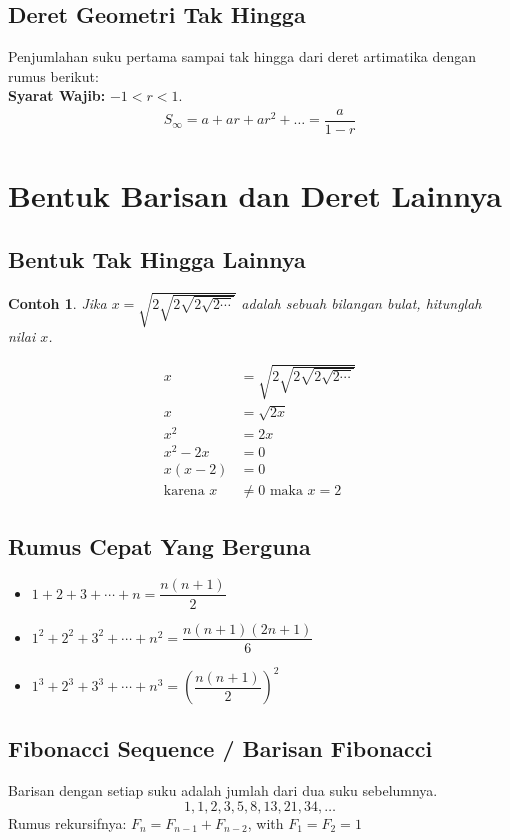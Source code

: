 \documentclass[12pt]{scrartcl}
\newtheorem{contoh}{Contoh}
\begin{document}
\subsection{Deret Geometri Tak Hingga}
Penjumlahan suku pertama sampai tak hingga dari deret artimatika dengan rumus berikut:\\
\textbf{Syarat Wajib: } $-1 < r < 1$.
\begin{align*}
    S_\infty = a + ar+ar^2+\ldots = \dfrac{a}{1-r}
\end{align*}

\section{Bentuk Barisan dan Deret Lainnya}

\subsection{Bentuk Tak Hingga Lainnya}
\begin{contoh}
Jika $x=\sqrt{2\sqrt{2\sqrt{2\sqrt{2\cdots}}}}$ adalah sebuah bilangan bulat, hitunglah nilai $x$.
\end{contoh}
\begin{solusi}
    \begin{align*}
        x &= \sqrt{2\sqrt{2\sqrt{2\sqrt{2\cdots}}}}\\
        x &= \sqrt{2x}\\
        x^2 &= 2x\\
        x^2 - 2x &= 0\\
        x(x - 2) &= 0\\
        \text{karena } x &\neq 0 \text{ maka } x = 2
    \end{align*}
\end{solusi}

\subsection{Rumus Cepat Yang Berguna}
\begin{itemize}
\item $1 + 2 + 3 + \cdots + n = \dfrac{n(n+1)}{2}$
\item $1^2 + 2^2 + 3^2 + \cdots + n^2 = \dfrac{n(n+1)(2n+1)}{6}$
\item $1^3 + 2^3 + 3^3 + \cdots + n^3 = \left(\dfrac{n(n+1)}{2}\right)^2$
\end{itemize}

\subsection{Fibonacci Sequence / Barisan Fibonacci}
Barisan dengan setiap suku adalah jumlah dari dua suku sebelumnya.
\[1, 1, 2, 3, 5, 8, 13, 21, 34, \ldots\]
Rumus rekursifnya: $F_n = F_{n-1} + F_{n-2}$, with $F_1 = F_2 = 1$
\end{document}
